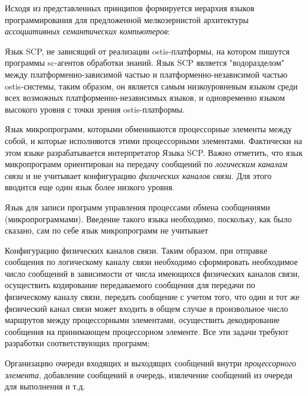 Исходя из представленных принципов формируется иерархия языков программирования для предложенной мелкозернистой архитектуры \textit{ассоциативных семантических компьютеров}:
\begin{textitemize}
	\item Язык SCP, не зависящий от реализации ostis-платформы, на котором пишутся программы sc-агентов обработки знаний. Язык SCP является "водоразделом"{} между платформенно-зависимой частью и платформенно-независимой частью ostis-системы, таким образом, он является самым низкоуровневым языком среди всех возможных платформенно-независимых языков, и одновременно языком высокого уровня с точки зрения ostis-платформы. 
	\item Язык микропрограмм, которыми обмениваются процессорные элементы между собой, и которые исполняются этими процессорными элементами. Фактически на этом языке разрабатывается интерпретатор Языка SCP. Важно отметить, что язык микропрограмм ориентирован на передачу сообщений по \textit{логическим каналам связи} и не учитывает конфигурацию \textit{физических каналов связи}. Для этого вводится еще один язык более низкого уровня.
	\item Язык для записи программ управления процессами обмена сообщениями (микропрограммами). Введение такого языка необходимо, поскольку, как было сказано, сам по себе язык микропрограмм не учитывает 
	\begin{textitemize}
		\item Конфигурацию физических каналов связи. Таким образом, при отправке сообщения по логическому каналу связи необходимо сформировать необходимое число сообщений в зависимости от числа имеющихся физических каналов связи, осуществить кодирование передаваемого сообщения для передачи по физическому каналу связи, передать сообщение с учетом того, что один и тот же физический канал связи может входить в общем случае в произвольное число маршрутов между процессорными элементами, осуществить декодирование сообщения на принимающем процессорном элементе. Все эти задачи требуют разработки соответствующих программ;
		\item Организацию очереди входящих и выходящих сообщений внутри \textit{процессорного элемента}, добавление сообщений в очередь, извлечение сообщений из очереди для выполнения и т.д.
	\end{textitemize}
\end{textitemize}


